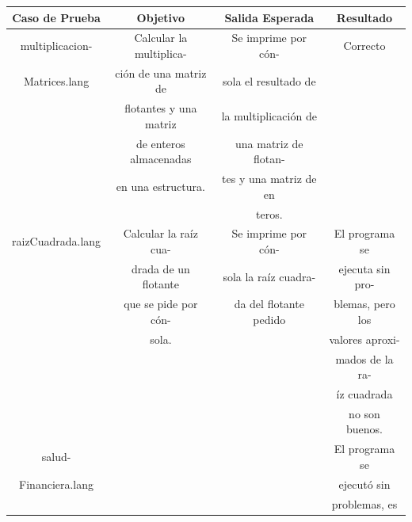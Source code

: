 \documentclass[11pt, spanish]{report}
\begin{document}
\begin{itemize}
  \newpage

  \begin{table}[!hbp]
    \begin{tabular}{c c c c}
      \hline            
      \hline            
      Caso de Prueba      & Objetivo               & Salida Esperada & Resultado \\ [0.5ex]
      \hline                         
      multiplicacion-     & Calcular la multiplica-& Se imprime por c\'on- & Correcto         \\ [1ex]
      Matrices.lang       & ci\'on de una matriz de& sola el resultado de  &                  \\ [1ex] 
                          & flotantes y una matriz & la multiplicaci\'on de&                  \\ [1ex] 
                          & de enteros almacenadas & una matriz de flotan- &                  \\ [1ex] 
                          & en una estructura.     & tes y una matriz de en&                  \\ [1ex] 
                          &                        & teros.                &                  \\ [1ex] 
      raizCuadrada.lang   & Calcular la ra\'iz cua-& Se imprime por c\'on- & El programa se   \\ [1ex] 
                          & drada de un flotante   & sola la ra\'iz cuadra-& ejecuta sin pro- \\ [1ex]
                          & que se pide por c\'on- & da del flotante pedido& blemas, pero los \\ [1ex] 
                          & sola.                  &                       & valores aproxi-  \\ [1ex]  
                          &                        &                       & mados de la ra-  \\ [1ex]  
                          &                        &                       & \'iz cuadrada    \\ [1ex] 
                          &                        &                       & no son buenos.   \\ [1ex] 
      salud-              &                        &                       & El programa se   \\ [1ex] 
      Financiera.lang     &                        &                       & ejecut\'o sin    \\ [1ex] 
                          &                        &                       & problemas, es    \\ [1ex]  

\end{tabular}
\end{table}
\end{itemize}
\end{document}
